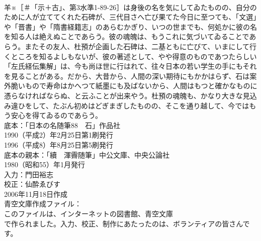 \documentclass[8pt]{extreport}
\begin{document}
\begin{CJK}{UTF8}{min}
\\	羊※［＃「示＋古」、第3水準1-89-26］は身後の名を気にしてゐたものの、自分のために人が立ててくれた石碑が、三代目さへ亡び果てた今日に至つても、「文選」や「晋書」や「隋書経籍志」のあらむかぎり、いつの世までも、何処かに彼の名を知る人は絶えぬことであらう。彼の魂魄は、もうこれに気づいてゐることであらう。またその友人、杜預が企画した石碑は、二基ともに亡びて、いまにして行くところを知るよしもないが、彼の著述として、やや得意のものであつたらしい「左氏経伝集解」は、今も尚ほ世に行はれて、往々日本の若い学生の手にもそれを見ることがある。だから、大昔から、人間の深い期待にもかかはらず、石は案外脆いもので寿命はかへつて紙墨にも及ばないから、人間はもつと確かなものに憑らなければならぬ、と云ふことが出来やう。杜預の魂魄も、かなり大きな見込み違ひをして、たぶん初めはどぎまぎしたものの、そこを通り越して、今ではもう安心を得てゐるのであらう。
\\	底本：「日本の名随筆88　石」作品社
\\	1990（平成2）年2月25日第1刷発行
\\	1996（平成8）年8月25日第5刷発行
\\	底本の親本：「續　渾霽随筆」中公文庫、中央公論社
\\	1980（昭和55）年1月発行
\\	入力：門田裕志
\\	校正：仙酔ゑびす
\\	2006年11月18日作成
\\	青空文庫作成ファイル：
\\	このファイルは、インターネットの図書館、青空文庫
\\	で作られました。入力、校正、制作にあたったのは、ボランティアの皆さんです。
\end{CJK}
\end{document}
